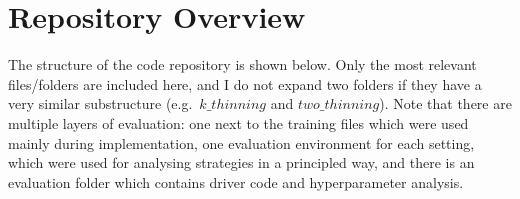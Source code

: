 \section{Repository Overview}

The structure of the code repository is shown below. Only the most relevant files/folders are included here, and I do not expand two folders if they have a very similar substructure (e.g.\ $k\_thinning$ and $two\_thinning$). Note that there are multiple layers of evaluation: one next to the training files which were used mainly during implementation, one evaluation environment for each setting, which were used for analysing strategies in a principled way, and there is an evaluation folder which contains driver code and hyperparameter analysis.




